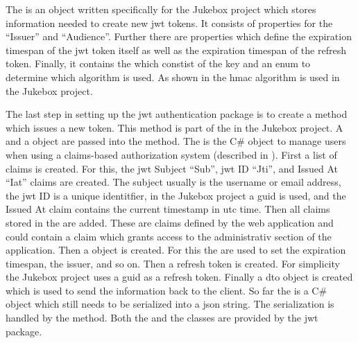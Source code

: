 
The  is an object written specifically for the Jukebox project which stores information needed to create new \gls{jwt} tokens. It consists of properties for the \enquote{Issuer} and \enquote{Audience}. Further there are properties which define the expiration timespan of the \gls{jwt} token itself as well as the expiration timespan of the refresh token. Finally, it contains the  which constist of the key and an enum to determine which algorithm is used. As shown in  the \gls{hmac} algorithm is used in the Jukebox project.


The last step in setting up the \gls{jwt} authentication package is to create a method which issues a new token. This method is part of the  in the Jukebox project. A  and a  object are passed into the method. The  is the C\# object to manage users when using a claims-based authorization system (described in ). First a list of claims is created. For this, the \gls{jwt} Subject \enquote{Sub}, \gls{jwt} ID \enquote{Jti}, and Issued At \enquote{Iat} claims are created. The subject usually is the username or email address, the \gls{jwt} ID is a unique identitfier, in the Jukebox project a \gls{guid} is used, and the Issued At claim contains the current timestamp in \gls{utc} time. Then all claims stored in the  are added. These are claims defined by the web application and \zB could contain a claim which grants access to the administrativ section of the application. Then a  object is created. For this the  are used to set the expiration timespan, the issuer, and so on. Then a refresh token is created. For simplicity the Jukebox project uses a \gls{guid} as a refresh token. Finally a  \gls{dto} object is created which is used to send the information back to the client. So far the  is a C\# object which still needs to be serialized into a \gls{json} string. The serialization is handled by the  method. Both the  and the  classes are provided by the \gls{jwt} package.



